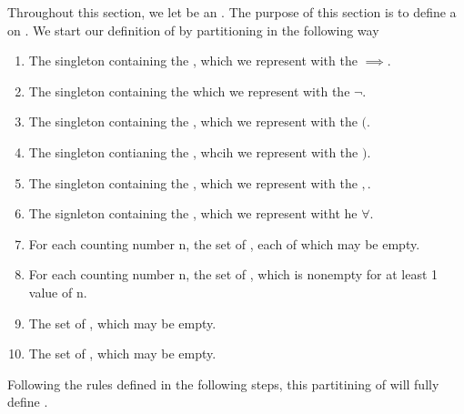 \begin{df}
\label{def:PredicateCalculusSymbols}

\rm
    Throughout this section, we let \scA be an \Alphabet.
    The purpose of this section is to define a \Grammar \scG on \scA. 
    We start our definition of \scG by partitioning \scA in the following way
    \begin{enumerate}
        \item The singleton containing the \Implication \Symbol, which we represent with the \Character $\implies$. 
        \item The singleton containing the \Negation \Symbol which we represent with the \Character $\neg$. 
        \item The singleton containing the \LeftParenthesis \Symbol, which we represent with the \Character $($. 
        \item The singleton contianing the \RightParenthesis \Symbol, whcih we represent with the \Character $)$. 
        \item The singleton containing the \Comma \Symbol, which we represent with the \Character $,$. 
        \item The signleton containing the \UniversalQuantifier, which we represent witht he \Character $\forall$. 
        \item For each counting number n, the set of , each of which may be empty.
        \item For each counting number n, the set of , which is nonempty for at least 1 value of n. 
        \item The set of \IndividualVariables, which may be empty. 
        \item The set of \IndividualConstants, which may be empty. 
    \end{enumerate}

    Following the rules defined in the following steps, this partitining of 
    \Symbols will fully define \scG. 
    
\end{df}
